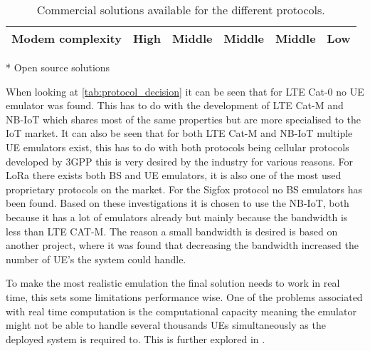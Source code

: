 \begin{table}[H]
{\begin{tabular}{|c|c|c|c|c|c|}
Modem complexity	& High 				& Middle 				& Middle 			& Middle 		& Low				\\ \hline
\end{tabular}}
\raggedright \scriptsize{ * Open source solutions} 
\caption{Commercial solutions available for the different protocols. \citep{UE_list, Amarisoft_solutions, SRS_solutions, LORA_solutions, Things_solutions, Mira_solutions, Telit_solutions, telefonicaid_solutions, murata_solutions}}%
\label{tab:protocol_decision}
\end{table}


When looking at \autoref{tab:protocol_decision} it can be seen that for \gls{LTE} Cat-0 no \gls{UE} emulator was found. This has to do with the development of \gls{LTE} Cat-M and \gls{NB-IoT} which shares most of the same properties but are more specialised to the \gls{IoT} market. It can also be seen that for both \gls{LTE} Cat-M and \gls{NB-IoT} multiple \gls{UE} emulators exist, this has to do with both protocols being cellular protocols developed by \gls{3GPP} this is very desired by the industry for various reasons. For \gls{LoRa} there exists both  \gls{BS} and \gls{UE} emulators, it is also one of the most used proprietary protocols on the market. For the Sigfox protocol no \gls{BS} emulators has been found. Based on these investigations it is chosen to use the \gls{NB-IoT}, both because it has a lot of emulators already but mainly because the bandwidth is less than LTE CAT-M. The reason a small bandwidth is desired is based on another project, where it was found that decreasing the bandwidth increased the number of UE's the system could handle.


To make the most realistic emulation the final solution needs to work in real time, this sets some limitations performance wise. One of the problems associated with real time computation is the computational capacity meaning the emulator might not be able to handle several thousands \gls{UE}s simultaneously as the deployed system is required to. This is further explored in .

